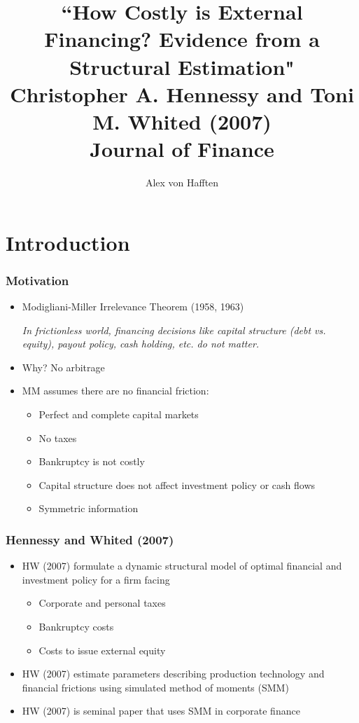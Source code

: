 \documentclass[usenames,dvipsnames, handout]{beamer}
\title[HW (2007)]{``How Costly is External Financing? Evidence from a Structural Estimation"\\Christopher A. Hennessy and Toni M. Whited (2007)\\Journal of Finance}
\author{Alex von Hafften}
\institute{UW-Madison}
\begin{document}
\begin{frame}
\titlepage
\end{frame}

\section{Introduction}

\begin{frame}
\frametitle{Motivation}
\small
\begin{itemize}
\item Modigliani-Miller Irrelevance Theorem (1958, 1963) 

\bigskip

\textit{In frictionless world, financing decisions like capital structure (debt vs. equity), payout policy, cash holding, etc. do not matter.}
\bigskip
\item Why? No arbitrage
\bigskip
\item MM assumes there are no financial friction:
\begin{itemize}
\item Perfect and complete capital markets
\item No taxes
\item Bankruptcy is not costly
\item Capital structure does not affect investment policy or cash flows
\item Symmetric information
\end{itemize}
\end{itemize}
\end{frame}



\begin{frame}
\frametitle{Hennessy and Whited (2007)}
\small
\begin{itemize}
\item HW (2007) formulate a dynamic structural model of optimal financial and investment policy for a firm facing
\begin{itemize}
\item Corporate and personal taxes
\item Bankruptcy costs
\item Costs to issue external equity
\end{itemize}
\bigskip
\item HW (2007) estimate parameters describing production technology and financial frictions using simulated method of moments (SMM)
\bigskip
\item HW (2007) is seminal paper that uses SMM in corporate finance
\end{itemize}
\end{frame}
\end{document}
